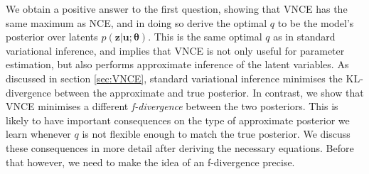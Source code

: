 \documentclass[11pt, oneside]{article}
\newcommand{\thetab}{{\boldsymbol{\theta}}}
\renewcommand{\u}{{\mathbf u}}
\newcommand{\z}{{\mathbf z}}
\theoremstyle{definition}
\begin{document}
We obtain a positive answer to the first question, showing that VNCE has the same maximum as NCE, and in doing so derive the optimal $q$ to be the model's posterior over latents $p(\z | \u ; \thetab)$. This is the same optimal $q$ as in standard variational inference, and implies that VNCE is not only useful for parameter estimation, but also performs approximate inference of the latent variables. As discussed in section \ref{sec:VNCE}, standard variational inference minimises the KL-divergence between the approximate and true posterior. In contrast, we show that VNCE minimises a different \emph{f-divergence} between the two posteriors. This is likely to have important consequences on the type of approximate posterior we learn whenever $q$ is not flexible enough to match the true posterior. We discuss these consequences in more detail after deriving the necessary equations. Before that however, we need to make the idea of an f-divergence precise.
\end{document}
